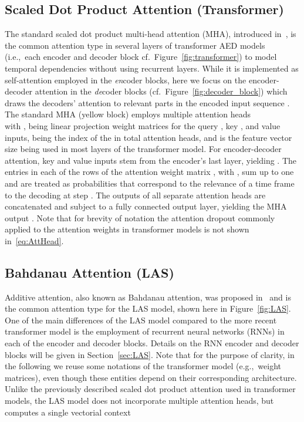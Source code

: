 \documentclass{article}
\begin{document}
\subsection{Scaled Dot Product Attention (Transformer)}\vspace{-2mm}
The standard scaled dot product multi-head attention (MHA), introduced in~\cite{Vaswani2017}, is the common attention type in several layers of transformer AED models (i.e.,\ each encoder and decoder block cf.\ Figure~\ref{fig:transformer}) to model temporal dependencies without using recurrent layers. While it is implemented as self-attention employed in the \textit{en}coder blocks, here we focus on the encoder-decoder attention in the \textit{de}coder blocks (cf.\ Figure~\ref{fig:decoder_block}) which draws the decoders' attention to relevant parts in the encoded input sequence . The standard MHA (yellow block) employs multiple attention heads
\vspace{-2mm}\vspace{-2mm}\\
with ,  being linear projection weight matrices for the query , key , and value  inputs,  being the index of the in total  attention heads, and  is the feature vector size being used in most layers of the transformer model. For encoder-decoder attention, key and value inputs stem from the encoder's last layer, yielding . The entries in each of the  rows of the attention weight matrix , with , sum up to one and are treated as probabilities that correspond to the relevance of a time frame  to the decoding at step . The outputs  of all  separate attention heads are concatenated and subject to a fully connected output layer, yielding the MHA output . Note that for brevity of notation the attention dropout commonly applied to the attention weights in transformer models is not shown in~\eqref{eq:AttHead}. 
 \vspace{-1mm}
\subsection{Bahdanau Attention (LAS)}\vspace{-2mm}
Additive attention, also known as Bahdanau attention, was proposed in~\cite{Bahdanau2015} and is the common attention type for the LAS model, shown here in Figure~\ref{fig:LAS}. One of the main differences of the LAS model compared to the more recent transformer model is the employment of recurrent neural networks (RNNs) in each of the encoder and decoder blocks. Details on the RNN encoder and decoder blocks will be given in Section~\ref{sec:LAS}. Note that for the purpose of clarity, in the following we reuse some notations of the transformer model (e.g.,\ weight matrices), even though these entities depend on their corresponding architecture. Unlike the previously described scaled dot product attention used in transformer models, the LAS model does not incorporate multiple attention heads, but computes a single vectorial context   
\vspace{-1mm}
\end{document}

